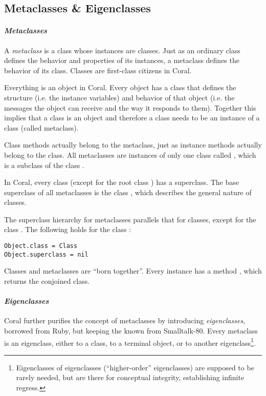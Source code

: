\subsection{Metaclasses \& Eigenclasses}
\label{sec:metaclasses}
\label{sec:eigenclasses}

\paragraph{\em Metaclasses}
A {\em metaclass} is a class whose instances are classes. Just as an ordinary class defines the behavior and properties of its instances, a metaclass defines the behavior of its class. Classes are first-class citizens in Coral. 

Everything is an object in Coral. Every object has a class that defines the structure (i.e. the instance variables) and behavior of that object (i.e. the messages the object can receive and the way it responds to them). Together this implies that a class is an object and therefore a class needs to be an instance of a class (called metaclass). 

Class methods actually belong to the metaclass, just as instance methods actually belong to the class. All metaclasses are instances of only one class called , which is a subclass of the class . 

In Coral, every class (except for the root class ) has a superclass. The base superclass of all metaclasses is the class , which describes the general nature of classes. 

The superclass hierarchy for metaclasses parallels that for classes, except for the class . The following holds for the class :
\begin{lstlisting}[deletekeywords={class}]
Object.class = Class
Object.superclass = nil
\end{lstlisting}

Classes and metaclasses are ``born together''. Every  instance has a method , which returns the conjoined class. 

\paragraph{\em Eigenclasses}
Coral further purifies the concept of metaclasses by introducing {\em eigenclasses}, borrowed from Ruby, but keeping the  known from Smalltalk-80. Every metaclass is an eigenclass, either to a class, to a terminal object, or to another eigenclass\footnote{Eigenclasses of eigenclasses (``higher-order'' eigenclasses) are supposed to be rarely needed, but are there for conceptual integrity, establishing infinite regress.}. 


